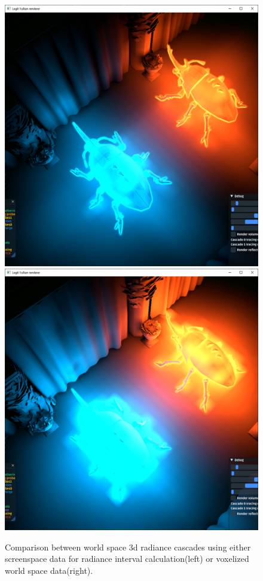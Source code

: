 \documentclass{jcgt}
\begin{document}
\begin{figure}[htb]
  \centering
  \includegraphics[width=0.49\columnwidth]{images/radiance_3d_from_voxels.png}
  \includegraphics[width=0.49\columnwidth]{images/radiance_3d_from_screenspace.png}
  \caption{\label{fig:radiance_3d_voxels}
     Comparison between world space 3d radiance cascades using either screenspace data for radiance interval calculation(left) or voxelized world space data(right).}
\end{figure}
\end{document}
